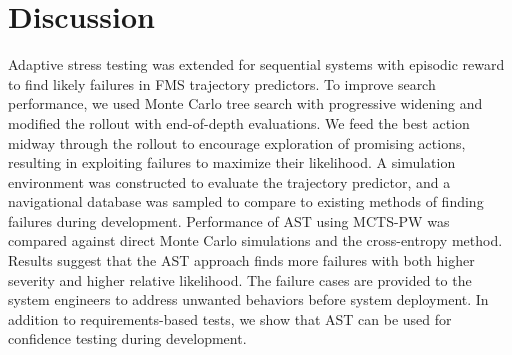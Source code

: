 \section{Discussion}
\label{sec:ast_discussion}
Adaptive stress testing was extended for sequential systems with episodic reward to find likely failures in FMS trajectory predictors.
To improve search performance, we used Monte Carlo tree search with progressive widening and modified the rollout with end-of-depth evaluations.
We feed the best action midway through the rollout to encourage exploration of promising actions, resulting in exploiting failures to maximize their likelihood. 
A simulation environment was constructed to evaluate the trajectory predictor, and a navigational database was sampled to compare to existing methods of finding failures during development.
Performance of AST using MCTS-PW was compared against direct Monte Carlo simulations and the cross-entropy method.
Results suggest that the AST approach finds more failures with both higher severity and higher relative likelihood.
The failure cases are provided to the system engineers to address unwanted behaviors before system deployment.
In addition to requirements-based tests, we show that AST can be used for confidence testing during development.
